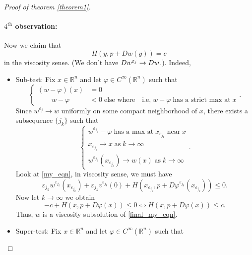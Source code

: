 \documentclass[12pt, oneside]{amsart}  	%
\begin{document}
\begin{proof}[Proof of theorem \ref{theorem1}]
\paragraph{\textbf{$4^{\text{th}}$ observation:}} Now we claim that 
\begin{equation}\label{final_my_eqn}
H(y, p+ Dw(y))=c
\end{equation}
in the viscosity sense.
(We don't have $Dw^{\varepsilon_j}\to Dw$.). Indeed, 
\begin{itemize}
\item Sub-test: Fix $x\in \mathbb{R}^n$ and let $\varphi\in C^\infty(\mathbb{R}^n)$ such that 
\begin{equation*}
\begin{cases}
(w - \varphi)(x) &= 0\\
\qquad w - \varphi &<0 \;\text{else where}\quad \text{i.e,}\; w-\varphi\;\text{has a strict max at}\; x
\end{cases}.
\end{equation*}
Since $w^{\varepsilon_j}\longrightarrow w$ uniformly on some compact neighborhood of $x$, there exists a subsequence $\{j_k\}$ such that 
\begin{equation*}
\begin{cases}
w^{\varepsilon_{j_k}} - \varphi \;\text{has a max at}\; x_{\varepsilon_{j_k}}\;\text{near}\;x\\
x_{\varepsilon_{j_k}} \longrightarrow x \;\text{as}\; k\longrightarrow\infty\\
w^{\varepsilon_{j_k}}\left(x_{\varepsilon_{j_k}}\right) \longrightarrow w(x) \;\text{as}\; k\longrightarrow\infty
\end{cases}.
\end{equation*}
Look at \eqref{my_eqn}, in viscosity sense, we must have
\begin{equation*}
\varepsilon_{j_k}
w^{\varepsilon_{j_k}}\left(x_{\varepsilon_{j_k}}\right) + 
\varepsilon_{j_k} v^{\varepsilon_{j_k}}(0) +
H(x_{\varepsilon_{j_k}},p+ D\varphi^{\varepsilon_{j_k}}(x_{\varepsilon_{j_k}})) \leq 0.
\end{equation*}
Now let $k\longrightarrow \infty$ we obtain 
\begin{equation*}
-c + H(x,p+D\varphi(x)) \leq 0 \Longleftrightarrow H(x,p+D\varphi(x)) \leq c.
\end{equation*}
Thus, $w$ is a viscosity subsolution of \eqref{final_my_eqn}.
\item Super-test: Fix $x\in \mathbb{R}^n$ and let $\varphi\in C^\infty(\mathbb{R}^n)$ such that 
\begin{equation*}

\end{equation*}
\end{itemize}
\end{proof}
\end{document}
